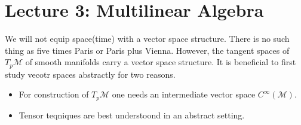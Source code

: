 \documentclass[10pt, oneside]{article}
\newcommand{\M}{\mathcal{M}}
\begin{document}
\section*{Lecture 3: Multilinear Algebra}
         We will not equip space(time) with a vector space structure. There is no such thing as five times Paris or Paris plus Vienna. However, the tangent spaces of $T_p \M$ of smooth manifolds carry a vector space structure.
         It is beneficial to first study vecotr spaces abstractly for two reasons.
         \begin{itemize}
            \item For construction of $T_p \M$ one needs an intermediate vector space $C^\infty (\M)$.
            \item Tensor teqniques are best understoond in an abstract setting.
         \end{itemize}
\end{document}
